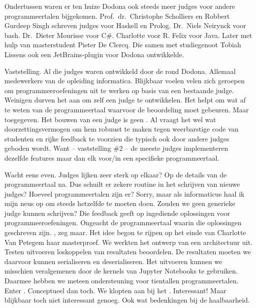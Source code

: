 Ondertussen waren er ten huize Dodona ook steeds meer judges voor andere programmeertalen bijgekomen.
Prof.\ dr.\ Christophe Scholliers en Robbert Gurdeep Singh schreven judges voor Haskell en Prolog.
Dr.\ Niels Neirynck voor bash.
Dr.\ Dieter Mourisse voor C\#\@.
Charlotte voor R\@.
Felix voor Java.
Later met hulp van masterstudent Pieter De Clercq.
Die samen met studiegenoot Tobiah Lissens ook een JetBrains-plugin voor Dodona ontwikkelde.

Vaststelling.
Al die judges waren ontwikkeld door de  rond Dodona.
Allemaal medewerkers van de opleiding informatica.
Blijkbaar voelen velen zich geroepen om programmeeroefeningen uit te werken op basis van een bestaande judge.
Weinigen durven het aan om zelf een judge te ontwikkelen.
Het helpt om wat af te weten van de programmeertaal waarvoor de beoordeling moet gebeuren.
Maar toegegeven.
Het bouwen van een judge is geen .
Al vraagt het wel wat doorzettingsvermogen om hem robuust te maken tegen weerbarstige code van studenten en rijke feedback te voorzien die typisch ook door andere judges geboden wordt.
Want -- vaststelling \#2 -- de meeste judges implementeren  dezelfde features maar dan elk voor/in een specifieke programmeertaal.

Wacht eens even.
Judges lijken zeer sterk op elkaar?
Op de details van de programmeertaal na.
Dus schuilt er zekere routine in het schrijven van nieuwe judges?
Hoeveel programmeertalen zijn er?
Sorry, maar als informaticus haal ik mijn neus op om steeds hetzelfde te moeten doen.
Zouden we geen generieke judge kunnen schrijven?
Die feedback geeft op ingediende oplossingen voor programmeeroefeningen.
Ongeacht de programmeertaal waarin die oplossingen geschreven zijn.
, zeg maar.
Het idee begon te rijpen op het einde van Charlotte Van Petegem haar masterproef.
We werkten het ontwerp van een architectuur uit.
Testen uitvoeren loskoppelen van resultaten beoordelen.
De resultaten moeten we daarvoor kunnen serialiseren en deserialiseren.
Het uitvoeren kunnen we misschien veralgemenen door de kernels van Jupyter Notebooks te gebruiken.
Daarmee hebben we meteen ondersteuning voor tientallen programmeertalen.
Enter \tested{}.
Conceptueel dan toch.
We klopten aan bij het \@.
Interessant!
Maar blijkbaar toch niet interessant genoeg.
Ook wat bedenkingen bij de haalbaarheid.

